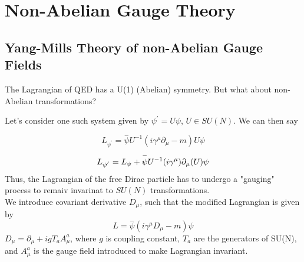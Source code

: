 
\chapter{Non-Abelian Gauge Theory} %

\label{Chapter3} %



\section{Yang-Mills Theory of non-Abelian Gauge Fields}
The Lagrangian of QED has a U(1) (Abelian) symmetry. But what about non-Abelian transformations?

Let's consider one such system given by $\psi^{'} = U\psi$, $U \in SU(N)$. We can then say \cite{lahiri04}

\begin{equation}
{L_{\psi^{'}}} = \overset{-}{\psi}U^{-1}(i{\gamma^\mu}\partial_\mu-m)U{\psi}
\end{equation}
\begin{equation}
{L_{\psi^{'}}} = {L_\psi} + \overset{-}{\psi}U^{-1}(i{\gamma^\mu}){\partial_{\mu}}(U){\psi} \\
\end{equation}
Thus, the Lagrangian of the free Dirac particle has to undergo a "gauging" process to remaiv invarinat to $SU(N)$ transformations.\\
We introduce covariant derivative $D_{\mu}$, such that the modified Lagrangian is given by \cite{lahiri04}
\begin{equation}
{L} = \overset{-}{\psi}(i{\gamma^\mu}D_\mu-m){\psi}
\end{equation}
$D_\mu = \partial_\mu +igT_{a}A^{a}_{\mu}$, where $g$ is coupling constant, $T_{a}$ are the generators of SU(N), and $A^{a}_{\mu}$ is the gauge field introduced to make Lagrangian invariant.


